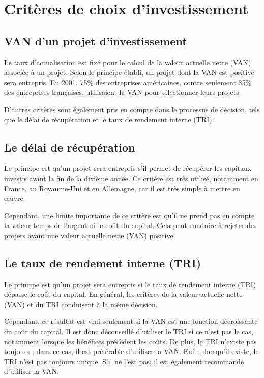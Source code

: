 \documentclass[a4paper, 12pt]{report}
\begin{document}
\chapter{Critères de  choix d'investissement}


\section{VAN d'un projet d'investissement}

Le taux d'actualisation est fixé pour le calcul de la valeur actuelle nette (VAN) associée à un projet. Selon le principe établi, un projet dont la VAN est positive sera entrepris. En 2001, 75\% des entreprises américaines, contre seulement 35\% des entreprises françaises, utilisaient la VAN pour sélectionner leurs projets.

D'autres critères sont également pris en compte dans le processus de décision, tels que le délai de récupération et le taux de rendement interne (TRI).

\section{Le délai de récupération}

Le principe est qu'un projet sera entrepris s'il permet de récupérer les capitaux investis avant la fin de la dixième année. Ce critère est très utilisé, notamment en France, au Royaume-Uni et en Allemagne, car il est très simple à mettre en œuvre.

Cependant, une limite importante de ce critère est qu'il ne prend pas en compte la valeur temps de l'argent ni le coût du capital. Cela peut conduire à rejeter des projets ayant une valeur actuelle nette (VAN) positive.

\section{Le taux de rendement interne (TRI)}

Le principe est qu'un projet sera entrepris si le taux de rendement interne (TRI) dépasse le coût du capital. En général, les critères de la valeur actuelle nette (VAN) et du TRI conduisent à la même décision.

Cependant, ce résultat est vrai seulement si la VAN est une fonction décroissante du coût du capital. Il est donc déconseillé d'utiliser le TRI si ce n'est pas le cas, notamment lorsque les bénéfices précèdent les coûts. De plus, le TRI n'existe pas toujours ; dans ce cas, il est préférable d'utiliser la VAN. Enfin, lorsqu'il existe, le TRI n'est pas toujours unique. S'il ne l'est pas, il est également recommandé d'utiliser la VAN.
\end{document}
